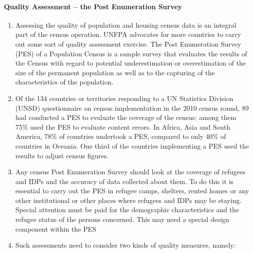 \documentclass[
]{article}
\begin{document}
\hypertarget{a.1.-quality-assessment-the-post-enumeration-survey}{%
\paragraph{Quality Assessment -- the Post Enumeration Survey}\label{a.1.-quality-assessment-the-post-enumeration-survey}}

\begin{enumerate}
\def\labelenumi{\arabic{enumi}.}
\setcounter{enumi}{107}
\item
  Assessing the quality of population and housing census data is an
  integral part of the census operation. UNFPA advocates for more
  countries to carry out some sort of quality assessment exercise. The
  Post Enumeration Survey (PES) of a Population Census is a sample
  survey that evaluates the results of the Census with regard to
  potential underestimation or overestimation of the size of the
  permanent population as well as to the capturing of the
  characteristics of the population.
\item
  Of the 134 countries or territories responding to a UN Statistics
  Division (UNSD) questionnaire on census implementation in the 2010
  census round, 89 had conducted a PES to evaluate the coverage of the
  census; among them 75\% used the PES to evaluate content errors. In
  Africa, Asia and South America, 78\% of countries undertook a PES,
  compared to only 40\% of countries in Oceania. One third of the
  countries implementing a PES used the results to adjust census
  figures.
\item
  Any census Post Enumeration Survey should look at the coverage of
  refugees and IDPs and the accuracy of data collected about them. To
  do this it is essential to carry out the PES in refugee camps,
  shelters, rented homes or any other institutional or other places
  where refugees and IDPs may be staying. Special attention must be
  paid for the demographic characteristics and the refugee status of
  the persons concerned. This may need a special design component
  within the PES
\item
  Such assessments need to consider two kinds of quality measures,
  namely:
\end{enumerate}
\end{document}
